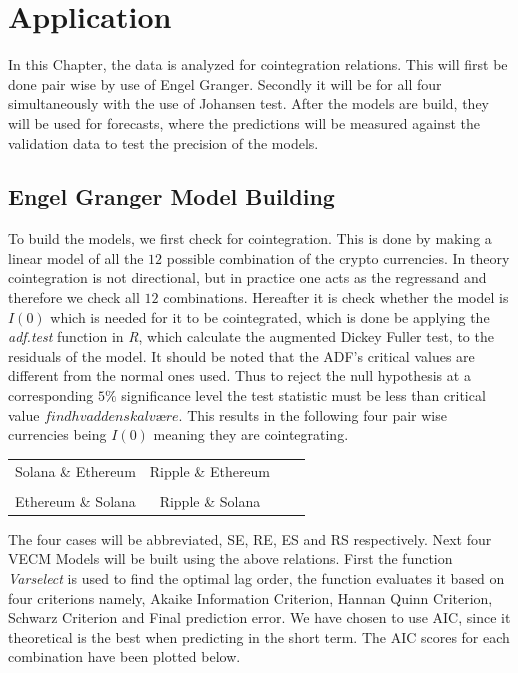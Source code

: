 \chapter{Application}
In this Chapter, the data is analyzed for cointegration relations. This will first be done pair wise by use of Engel Granger. Secondly it will be for all four simultaneously with the use of Johansen test. After the models are build, they will be used for forecasts, where the predictions will be measured against the validation data to test the precision of the models.


\section{Engel Granger Model Building}
To build the models, we first check for cointegration. This is done by making a linear model of all the $12$ possible combination of the crypto currencies. In theory cointegration is not directional, but in practice one acts as the regressand and therefore we check all $12$ combinations. Hereafter it is check whether the model is $I(0)$ which is needed for it to be cointegrated, which is done be applying the \textit{adf.test} function in \textit{R}, which calculate the augmented Dickey Fuller test, to the residuals of the model. It should be noted that the ADF's critical values are different from the normal ones used. Thus to reject the null hypothesis at a corresponding $5\%$ significance level the test statistic must be less than critical value $find hvad den skal være$. This results in the following four pair wise currencies being $I(0)$ meaning they are cointegrating. 
\pause
\begin{center}
\begin{tabular}{cccc}
   Solana \& Ethereum \quad & \quad Ripple \& Ethereum\\\\
   Ethereum \& Solana \quad & \quad Ripple \& Solana
\end{tabular}
\end{center}
\pause
\noindent The four cases will be abbreviated, SE, RE, ES and RS respectively. Next four VECM Models will be built using the above relations. First the function \textit{Varselect} is used to find the optimal lag order, the function evaluates it based on four criterions namely, Akaike Information Criterion, Hannan Quinn Criterion, Schwarz Criterion and Final prediction error. We have chosen to use AIC, since it theoretical is the best when predicting in the short term. The AIC scores for each combination have been plotted below.


